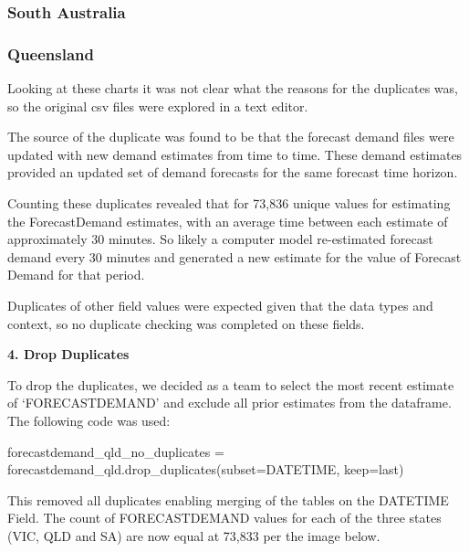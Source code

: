 \documentclass[
]{article}
\newenvironment{Shaded}{}{}
\newcommand{\NormalTok}[1]{#1}
\newcommand{\OperatorTok}[1]{\textcolor[rgb]{0.40,0.40,0.40}{#1}}
\newcommand{\StringTok}[1]{\textcolor[rgb]{0.25,0.44,0.63}{#1}}
\begin{document}
\subsubsection{South Australia}\label{south-australia}

\subsubsection{Queensland}\label{queensland}

Looking at these charts it was not clear what the reasons for the
duplicates was, so the original csv files were explored in a text
editor.

The source of the duplicate was found to be that the forecast demand
files were updated with new demand estimates from time to time. These
demand estimates provided an updated set of demand forecasts for the
same forecast time horizon.

Counting these duplicates revealed that for 73,836 unique values for
estimating the ForecastDemand estimates, with an average time between
each estimate of approximately 30 minutes. So likely a computer model
re-estimated forecast demand every 30 minutes and generated a new
estimate for the value of Forecast Demand for that period.

Duplicates of other field values were expected given that the data types
and context, so no duplicate checking was completed on these fields.

\textbf{4. Drop Duplicates}

To drop the duplicates, we decided as a team to select the most recent
estimate of `FORECASTDEMAND' and exclude all prior estimates from the
dataframe. The following code was used:

\begin{Shaded}
\begin{Highlighting}[]
\NormalTok{forecastdemand\_qld\_no\_duplicates }\OperatorTok{=}\NormalTok{ forecastdemand\_qld.drop\_duplicates(subset}\OperatorTok{=}\StringTok{\textquotesingle{}DATETIME\textquotesingle{}}\NormalTok{, keep}\OperatorTok{=}\StringTok{\textquotesingle{}last\textquotesingle{}}\NormalTok{)}
\end{Highlighting}
\end{Shaded}

This removed all duplicates enabling merging of the tables on the
DATETIME Field. The count of FORECASTDEMAND values for each of the three
states (VIC, QLD and SA) are now equal at 73,833 per the image below.
\end{document}
